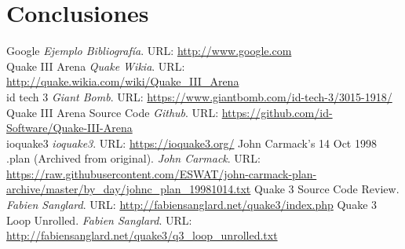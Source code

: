 \documentclass[a4paper,12pt]{report}
\begin{document}
	\section{Conclusiones}
			
	
	
	
	\begin{appendices}
	
	\end{appendices}
	
	\begin{thebibliography}{9}
		
		Google \emph{Ejemplo Bibliografía}. URL: \url{http://www.google.com}\\
		Quake III Arena \emph{Quake Wikia}. URL: \url{http://quake.wikia.com/wiki/Quake_III_Arena}\\
		 id tech 3 \emph{Giant Bomb}. URL: \url{https://www.giantbomb.com/id-tech-3/3015-1918/}\\
		 Quake III Arena Source Code \emph{Github}. URL: \url{https://github.com/id-Software/Quake-III-Arena}\\
		 ioquake3 \emph{ioquake3}. URL: \url{https://ioquake3.org/}
         John Carmack's 14 Oct 1998 .plan (Archived from original). \emph{John Carmack}. URL: \url{https://raw.githubusercontent.com/ESWAT/john-carmack-plan-archive/master/by_day/johnc_plan_19981014.txt}
		 Quake 3 Source Code Review. \emph{Fabien Sanglard}. URL: \url{http://fabiensanglard.net/quake3/index.php}
         Quake 3 Loop Unrolled. \emph{Fabien Sanglard}. URL: \url{http://fabiensanglard.net/quake3/q3_loop_unrolled.txt}
		
	\end{thebibliography}


	
	
\end{document}
